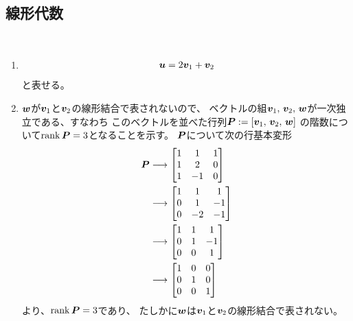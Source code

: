 \subsection{線形代数}
\begin{ans*}
  ${}$
  \begin{enumerate}[label=(\arabic*)]
    \item
    \begin{gather}
      {\bm{u}} = 2{\bm{v}}_{1} + {\bm{v}}_{2}
    \end{gather}
    と表せる。
    \item ${\bm{w}}$が${\bm{v}}_{1}$と${\bm{v}}_{2}$の線形結合で表されないので、
    ベクトルの組${\bm{v}}_{1},\,{\bm{v}}_{2},\,{\bm{w}}$が一次独立である、すなわち
    このベクトルを並べた行列$\bm{P} := [{\bm{v}}_{1},\,{\bm{v}}_{2},\,{\bm{w}}]$
    の階数について$\operatorname{rank}\bm{P}=3$となることを示す。
    $\bm{P}$について次の行基本変形
    \begin{align}
      \bm{P}
      &\longrightarrow \begin{bmatrix}
        1 & 1 & 1 \\
        1 & 2 & 0 \\
        1 & -1 & 0
      \end{bmatrix} \\
      &\longrightarrow \begin{bmatrix}
        1 & 1 & 1 \\
        0 & 1 & -1 \\
        0 & -2 & -1
      \end{bmatrix} \\
      &\longrightarrow \begin{bmatrix}
        1 & 1 & 1 \\
        0 & 1 & -1 \\
        0 & 0 & 1
      \end{bmatrix} \\
      &\longrightarrow \begin{bmatrix}
        1 & 0 & 0 \\
        0 & 1 & 0 \\
        0 & 0 & 1
      \end{bmatrix}
    \end{align}
    より、$\operatorname{rank}\bm{P} = 3$であり、
    たしかに${\bm{w}}$は${\bm{v}}_{1}$と${\bm{v}}_{2}$の線形結合で表されない。
  \end{enumerate}
\end{ans*}

